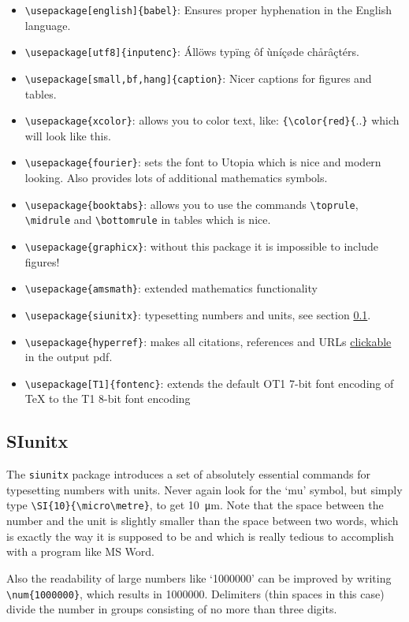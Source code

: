 \documentclass{article}
\begin{document}
\begin{itemize}
\item \verb|\usepackage[english]{babel}|: Ensures proper hyphenation in the English language.
\item \verb|\usepackage[utf8]{inputenc}|: Állöws typïng ôf ùníçøde chårâçtérs.
\item \verb|\usepackage[small,bf,hang]{caption}|: Nicer captions for figures and tables.
\item \verb|\usepackage{xcolor}|: allows you to color text, like: \verb|{\color{red}{|..\verb|}| which will look {\color{red} like this}.
\item \verb|\usepackage{fourier}|: sets the font to Utopia which is nice and modern looking. Also provides lots of additional mathematics symbols.
\item \verb|\usepackage{booktabs}|: allows you to use the commands \verb|\toprule|, \verb|\midrule| and \verb|\bottomrule| in tables which is nice.
\item \verb|\usepackage{graphicx}|: without this package it is impossible to include figures!
\item \verb|\usepackage{amsmath}|: extended mathematics functionality
\item \verb|\usepackage{siunitx}|: typesetting numbers and units, see section \ref{sec:siunitx}.
\item \verb|\usepackage{hyperref}|: makes all citations, references and URLs \hyperref[clickable]{clickable} in the output pdf. \label{clickable}
\item \verb|\usepackage[T1]{fontenc}|: extends the default OT1 7-bit font encoding of TeX to the T1 8-bit font encoding
\end{itemize}


\subsection{SIunitx}\label{sec:siunitx}

The \verb|siunitx| package introduces a set of absolutely essential commands for typesetting numbers with units. Never again look for the `mu' symbol, but simply type \verb|\SI{10}{\micro\metre}|, to get \SI{10}{\micro\metre}. Note that the space between the number and the unit is slightly smaller than the space between two words, which is exactly the way it is supposed to be and which is really tedious to accomplish with a program like MS Word.

Also the readability of large numbers like `1000000' can be improved by writing \verb|\num{1000000}|, which results in \num{1000000}. Delimiters (thin spaces in this case) divide the number in groups consisting of no more than three digits.
\end{document}
